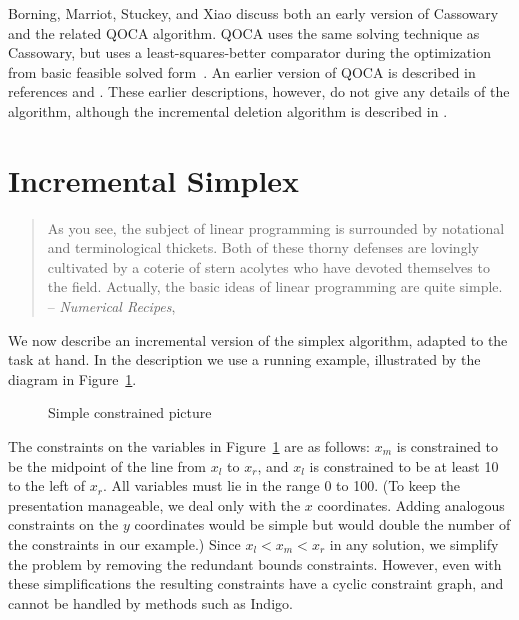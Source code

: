 \documentclass{article}
\begin{document}
Borning, Marriot, Stuckey, and Xiao discuss both an early version of
Cassowary and the related QOCA algorithm.  QOCA uses the same solving
technique as Cassowary, but uses a least-squares-better comparator
during the optimization from basic feasible solved
form~\cite{borning-uist-97,borning-simplex-tr}.  An earlier version of
QOCA is described in references \cite{helm-gi-92} and
\cite{helm-eurographics-92}.  These earlier descriptions, however, do
not give any details of the algorithm, although the incremental deletion
algorithm is described in \cite{huynh-marriott-96}.


\section{Incremental Simplex}
\label{inc-simplex}

\begin{quotation}
  As you see, the subject of linear programming is surrounded by
  notational and terminological thickets.  Both of these thorny defenses
  are lovingly cultivated by a coterie of stern acolytes who have
  devoted themselves to the field.  Actually, the basic ideas of linear
  programming are quite simple.  -- \emph{Numerical Recipes}, \cite[page
  424]{press-89}
\end{quotation}

We now describe an incremental version of the simplex algorithm, adapted
to the task at hand.  In the description we use a running example,
illustrated by the diagram in Figure~\ref{fig:pict}.

\begin{figure}[htb]
\begin{center}

\end{center}
\caption{Simple constrained picture\label{fig:pict}}
\end{figure}

The constraints on the variables in Figure~\ref{fig:pict} are as follows:
$x_m$ is constrained to be the midpoint of the line from $x_l$ to $x_r$,
and $x_l$ is constrained to be at least 10 to the left of $x_r$.  All
variables must lie in the range 0 to 100.  (To keep the presentation
manageable, we deal only with the $x$ coordinates.  Adding analogous
constraints on the $y$ coordinates would be simple but would double the
number of the constraints in our example.)  Since $x_l < x_m < x_r$ in any
solution, we simplify the problem by removing the redundant bounds
constraints.  However,
even with these simplifications the resulting constraints have a cyclic
constraint graph, and cannot be handled by methods such as Indigo.
\end{document}
